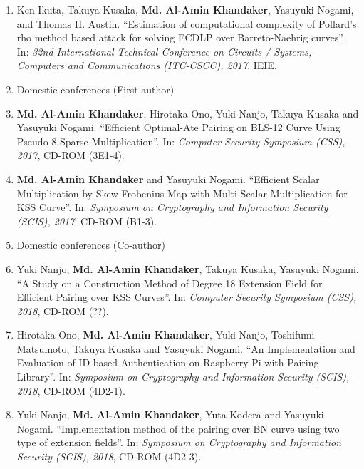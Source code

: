 \begin{enumerate}
	\item Ken Ikuta, Takuya Kusaka, \textbf{Md. Al-Amin Khandaker}, Yasuyuki Nogami, and Thomas H. Austin. ``Estimation of computational complexity of Pollard's rho method based attack for solving ECDLP over Barreto-Naehrig curves''. In: \textit{32nd International Technical Conference on Circuits / Systems, Computers and Communications (ITC-CSCC), 2017}. IEIE. 
\vspace{10mm}
\large
\item [] \Large Domestic conferences (First author)
	\normalsize
	
	\item \textbf{Md. Al-Amin Khandaker}, Hirotaka Ono, Yuki Nanjo, Takuya Kusaka and Yasuyuki Nogami. ``Efficient Optimal-Ate Pairing on BLS-12 Curve Using Pseudo 8-Sparse Multiplication''. In: \textit{Computer Security Symposium  (CSS),  2017}, CD-ROM (3E1-4). 
	
	\item \textbf{Md. Al-Amin Khandaker} and Yasuyuki Nogami. ``Efficient Scalar Multiplication by Skew Frobenius Map with Multi-Scalar Multiplication for KSS Curve''. In: \textit{Symposium on Cryptography and Information Security (SCIS),  2017}, CD-ROM (B1-3). 

	\vspace{10mm}
	\large
	\item[] \Large Domestic conferences (Co-author)
	\normalsize
	\item Yuki Nanjo,  \textbf{Md. Al-Amin Khandaker}, Takuya Kusaka, Yasuyuki Nogami. ``A Study on a Construction Method of Degree 18 Extension Field for Efficient Pairing over KSS Curves''. In: \textit{Computer Security Symposium  (CSS),  2018}, CD-ROM (??). 
	
	\item  Hirotaka Ono, \textbf{Md. Al-Amin Khandaker}, Yuki Nanjo, Toshifumi Matsumoto, Takuya Kusaka and Yasuyuki Nogami. ``An Implementation and Evaluation of ID-based Authentication on Raspberry Pi with Pairing Library''. In: \textit{Symposium on Cryptography and Information Security (SCIS),  2018}, CD-ROM (4D2-1).  
	
	\item Yuki Nanjo, \textbf{Md. Al-Amin Khandaker}, Yuta Kodera and Yasuyuki Nogami. ``Implementation method of the pairing over BN curve using two type of extension fields''. In: \textit{Symposium on Cryptography and Information Security (SCIS),  2018}, CD-ROM (4D2-3).
	

\end{enumerate}
